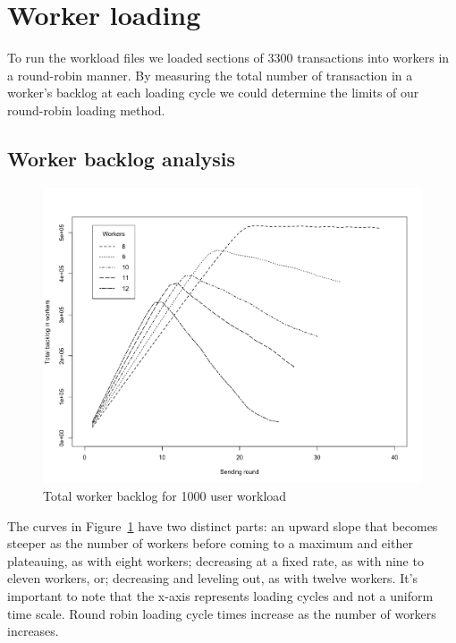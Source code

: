 \section{Worker loading}
To run the workload files we loaded sections of 3300 transactions into workers in a round-robin manner.
By measuring the total number of transaction in a worker's backlog at each loading cycle we could determine the limits of our round-robin loading method.

\subsection{Worker backlog analysis}

\begin{figure}[tbph]
  \centering
  \includegraphics[width=0.9\linewidth]{graphics/backlog_by_workers}
  \caption{Total worker backlog for 1000 user workload}
  \label{fig:backlog-total}
\end{figure}

The curves in Figure~\ref{fig:backlog-total} have two distinct parts: an upward slope that becomes steeper as the number of workers before coming to a maximum and either plateauing, as with eight workers; decreasing at a fixed rate, as with nine to eleven workers, or; decreasing and leveling out, as with twelve workers.
It's important to note that the x-axis represents loading cycles and not a uniform time scale.
Round robin loading cycle times increase as the number of workers increases.

